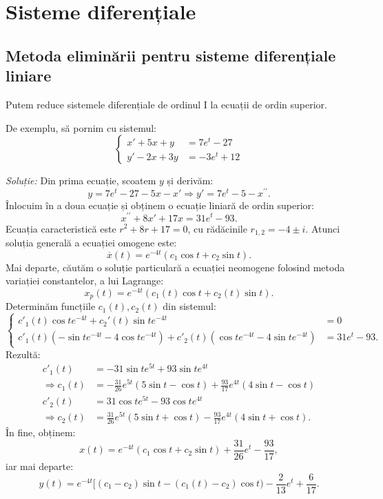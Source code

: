 \chapter{Sisteme diferențiale}

\section{Metoda eliminării pentru sisteme diferențiale liniare}

Putem reduce sistemele diferențiale de ordinul I la ecuații de ordin superior.

De exemplu, să pornim cu sistemul:
\[
  \begin{cases}
    x' + 5x + y &= 7e^t - 27 \\
    y' - 2x + 3y &= -3e^t + 12
  \end{cases}
\]

\emph{Soluție:} Din prima ecuație, scoatem $y$ și derivăm:
\[
  y = 7e^t - 27 - 5x - x' \Rightarrow y' = 7e^t - 5 - x^{\prime\prime}.
\]
Înlocuim în a doua ecuație și obținem o ecuație liniară de ordin superior:
\[
  x^{\prime\prime} + 8x' + 17x = 31e^t - 93.
\]
Ecuația caracteristică este $r^2 + 8r + 17 = 0$, cu rădăcinile $r_{1,2} = -4 \pm i$.
Atunci soluția generală a ecuației omogene este:
\[
  \overline{x}(t) = e^{-4t}(c_1 \cos t + c_2 \sin t).
\]
Mai departe, căutăm o soluție particulară a ecuației neomogene folosind metoda
variației constantelor, a lui Lagrange:
\[
  x_p(t) = e^{-4t}(c_1(t) \cos t + c_2(t) \sin t).
\]
Determinăm funcțiile $c_1(t), c_2(t)$ din sistemul:
\[
  \begin{cases}
    c'_1(t) \cos t e^{-4t} + c_2'(t) \sin t e^{-4t} &= 0 \\
    c'_1(t) (-\sin t e^{-4t} - 4\cos t e^{-4t}) + %
    c'_2(t) (\cos t e^{-4t} - 4\sin t e^{-4t}) &= 31e^t - 93.
  \end{cases}
\]
Rezultă:
\begin{align*}
  c'_1(t) &= -31 \sin t e^{5t} + 93 \sin t e^{4t} \\
  \Rightarrow c_1(t) &= -\frac{31}{26} e^{5t}(5 \sin t - \cos t) + %
                       \frac{93}{17} e^{4t}(4 \sin t - \cos t) \\
  c'_2(t) &= 31 \cos t e^{5t} - 93\cos t e^{4t} \\
  \Rightarrow c_2(t) &= \frac{31}{26} e^{5t}(5 \sin t + \cos t) - %
                       \frac{93}{17} e^{4t}(4 \sin t + \cos t).
\end{align*}
În fine, obținem:
\[
  x(t) = e^{-4t}(c_1 \cos t + c_2 \sin t) + \frac{31}{26}e^t - \frac{93}{17},
\]
iar mai departe:
\[
  y(t) = e^{-4t}[(c_1 - c_2) \sin t - (c_1(t) - c_2) \cos t) - \frac{2}{13} e^t + \frac{6}{17}.
\]

